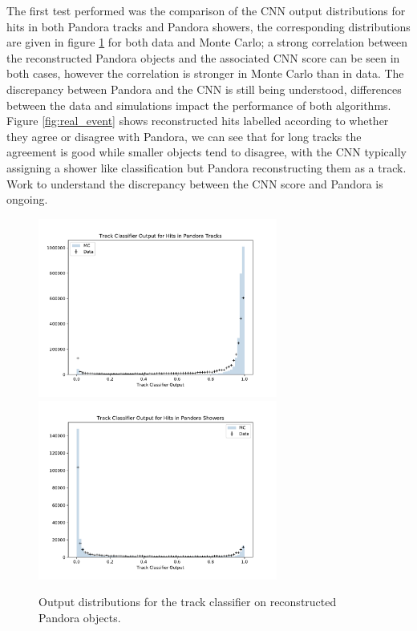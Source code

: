 The first test performed was the comparison of the CNN output distributions for
hits in both Pandora tracks and Pandora showers, the corresponding distributions
are given in figure \ref{fig:pandora} for both data and Monte Carlo; a strong
correlation between the reconstructed Pandora objects and the associated CNN
score can be seen in both cases, however the correlation is stronger in Monte
Carlo than in data. The discrepancy between Pandora and the CNN is still being
understood, differences between the data and simulations impact the performance
of both algorithms. Figure \ref{fig:real_event} shows reconstructed hits
labelled according to whether they agree or disagree with Pandora, we can see
that for long tracks the agreement is good while smaller objects tend to
disagree, with the CNN typically assigning a shower like classification but
Pandora reconstructing them as a track. Work to understand the discrepancy
between the CNN score and Pandora is ongoing.

\begin{figure}[h]
	\centering
	\includegraphics[width=0.7\textwidth]{figures/track_data_v_mc.pdf}
	\includegraphics[width=0.7\textwidth]{figures/shower_data_v_mc.pdf}
	\caption[Output distributions for the track classifier on reconstructed
	Pandora objects.]{Output distributions for the track classifier on
	reconstructed Pandora objects.} \label{fig:pandora}
\end{figure}

